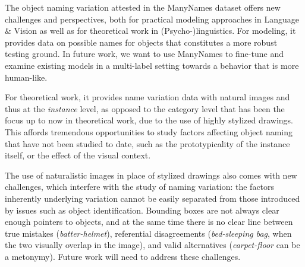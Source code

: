 The object naming variation attested in the ManyNames dataset offers new challenges and perspectives, both for practical modeling approaches in Language \& Vision as well as for theoretical work in (Psycho-)linguistics.
For modeling, it provides data on possible names for objects that constitutes a more robust testing ground.
In future work, we want to use ManyNames to fine-tune and examine  existing models in a multi-label setting towards a behavior that is more human-like. 

For theoretical work, it provides name variation data with natural images and thus at the \textit{instance} level, as opposed to the category level that has been the focus up to now in theoretical work, due to the use of highly stylized drawings.
This affords tremendous opportunities to study factors affecting object naming that have not been studied to date, such as the prototypicality of the instance itself, or the effect of the visual context.

The use of naturalistic images in place of stylized drawings also comes with new challenges, which interfere with the study of naming variation: the factors inherently underlying variation cannot be easily separated from those introduced by issues such as object identification.
Bounding boxes are not always clear enough pointers to objects, and at the same time there is no clear line between true mistakes (\textit{batter-helmet}), referential disagreements (\textit{bed-sleeping bag}, when the two visually overlap in the image), and valid alternatives (\textit{carpet-floor} can be a metonymy).
Future work will need to address these challenges. 

